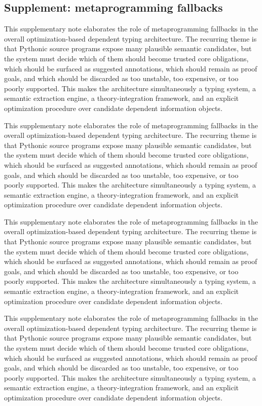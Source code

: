\documentclass[11pt]{article}
\theoremstyle{definition}
\theoremstyle{plain}
\begin{document}
\subsection{Supplement: metaprogramming fallbacks}
This supplementary note elaborates the role of metaprogramming fallbacks in the overall
optimization-based dependent typing architecture. The recurring theme is that
Pythonic source programs expose many plausible semantic candidates, but the
system must decide which of them should become trusted core obligations, which
should be surfaced as suggested annotations, which should remain as proof
goals, and which should be discarded as too unstable, too expensive, or too
poorly supported. This makes the architecture simultaneously a typing system,
a semantic extraction engine, a theory-integration framework, and an explicit
optimization procedure over candidate dependent information objects.

This supplementary note elaborates the role of metaprogramming fallbacks in the overall
optimization-based dependent typing architecture. The recurring theme is that
Pythonic source programs expose many plausible semantic candidates, but the
system must decide which of them should become trusted core obligations, which
should be surfaced as suggested annotations, which should remain as proof
goals, and which should be discarded as too unstable, too expensive, or too
poorly supported. This makes the architecture simultaneously a typing system,
a semantic extraction engine, a theory-integration framework, and an explicit
optimization procedure over candidate dependent information objects.

This supplementary note elaborates the role of metaprogramming fallbacks in the overall
optimization-based dependent typing architecture. The recurring theme is that
Pythonic source programs expose many plausible semantic candidates, but the
system must decide which of them should become trusted core obligations, which
should be surfaced as suggested annotations, which should remain as proof
goals, and which should be discarded as too unstable, too expensive, or too
poorly supported. This makes the architecture simultaneously a typing system,
a semantic extraction engine, a theory-integration framework, and an explicit
optimization procedure over candidate dependent information objects.

This supplementary note elaborates the role of metaprogramming fallbacks in the overall
optimization-based dependent typing architecture. The recurring theme is that
Pythonic source programs expose many plausible semantic candidates, but the
system must decide which of them should become trusted core obligations, which
should be surfaced as suggested annotations, which should remain as proof
goals, and which should be discarded as too unstable, too expensive, or too
poorly supported. This makes the architecture simultaneously a typing system,
a semantic extraction engine, a theory-integration framework, and an explicit
optimization procedure over candidate dependent information objects.
\end{document}
